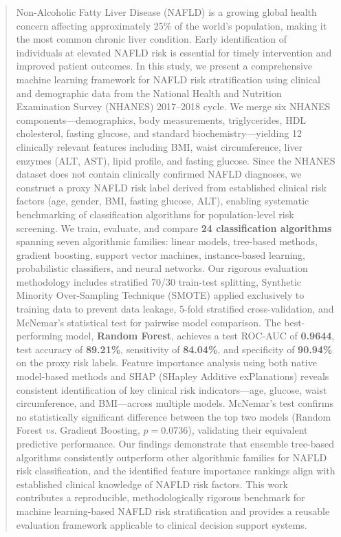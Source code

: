 \documentclass[conference,10pt]{IEEEtran}
\newcommand{\vs}{\textit{vs.}}
\begin{document}
\maketitle

\begin{abstract}
Non-Alcoholic Fatty Liver Disease (NAFLD) is a growing global health concern affecting approximately 25\% of the world's population, making it the most common chronic liver condition. Early identification of individuals at elevated NAFLD risk is essential for timely intervention and improved patient outcomes. In this study, we present a comprehensive machine learning framework for NAFLD risk stratification using clinical and demographic data from the National Health and Nutrition Examination Survey (NHANES) 2017--2018 cycle. We merge six NHANES components---demographics, body measurements, triglycerides, HDL cholesterol, fasting glucose, and standard biochemistry---yielding 12 clinically relevant features including BMI, waist circumference, liver enzymes (ALT, AST), lipid profile, and fasting glucose. Since the NHANES dataset does not contain clinically confirmed NAFLD diagnoses, we construct a proxy NAFLD risk label derived from established clinical risk factors (age, gender, BMI, fasting glucose, ALT), enabling systematic benchmarking of classification algorithms for population-level risk screening. We train, evaluate, and compare \textbf{24 classification algorithms} spanning seven algorithmic families: linear models, tree-based methods, gradient boosting, support vector machines, instance-based learning, probabilistic classifiers, and neural networks. Our rigorous evaluation methodology includes stratified 70/30 train-test splitting, Synthetic Minority Over-Sampling Technique (SMOTE) applied exclusively to training data to prevent data leakage, 5-fold stratified cross-validation, and McNemar's statistical test for pairwise model comparison. The best-performing model, \textbf{Random Forest}, achieves a test ROC-AUC of \textbf{0.9644}, test accuracy of \textbf{89.21\%}, sensitivity of \textbf{84.04\%}, and specificity of \textbf{90.94\%} on the proxy risk labels. Feature importance analysis using both native model-based methods and SHAP (SHapley Additive exPlanations) reveals consistent identification of key clinical risk indicators---age, glucose, waist circumference, and BMI---across multiple models. McNemar's test confirms no statistically significant difference between the top two models (Random Forest \vs{} Gradient Boosting, $p = 0.0736$), validating their equivalent predictive performance. Our findings demonstrate that ensemble tree-based algorithms consistently outperform other algorithmic families for NAFLD risk classification, and the identified feature importance rankings align with established clinical knowledge of NAFLD risk factors. This work contributes a reproducible, methodologically rigorous benchmark for machine learning-based NAFLD risk stratification and provides a reusable evaluation framework applicable to clinical decision support systems.
\end{abstract}
\end{document}

